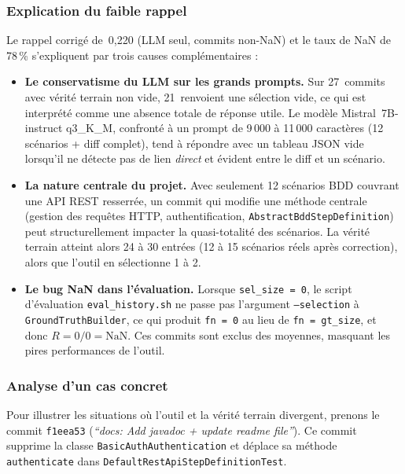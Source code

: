 \documentclass[12pt,a4paper]{article}
\begin{document}
\subsubsection{Explication du faible rappel}

Le rappel corrigé de~0{,}220 (LLM seul, commits non-NaN) et le taux de NaN
de 78\,\% s'expliquent par trois causes complémentaires :

\begin{itemize}
  \item \textbf{Le conservatisme du LLM sur les grands prompts.}
        Sur 27~commits avec vérité terrain non vide, 21~renvoient une
        sélection vide, ce qui est interprété comme une absence totale
        de réponse utile. Le modèle Mistral~7B-instruct q3\_K\_M,
        confronté à un prompt de 9\,000 à 11\,000 caractères (12 scénarios
        + diff complet), tend à répondre avec un tableau JSON vide lorsqu'il
        ne détecte pas de lien \emph{direct} et évident entre le diff et un
        scénario.

  \item \textbf{La nature centrale du projet.} Avec seulement 12 scénarios
        BDD couvrant une API REST resserrée, un commit qui modifie une
        méthode centrale (gestion des requêtes HTTP, authentification,
        \texttt{AbstractBddStepDefinition}) peut structurellement impacter
        la quasi-totalité des scénarios. La vérité terrain atteint alors
        24 à 30 entrées (12 à 15 scénarios réels après correction), alors
        que l'outil en sélectionne 1 à 2.

  \item \textbf{Le bug NaN dans l'évaluation.}
        Lorsque \texttt{sel\_size = 0}, le script d'évaluation
        \texttt{eval\_history.sh} ne passe pas l'argument
        \texttt{--selection} à \texttt{GroundTruthBuilder}, ce qui
        produit \texttt{fn = 0} au lieu de \texttt{fn = gt\_size},
        et donc $R = 0/0 = \text{NaN}$. Ces commits sont exclus des
        moyennes, masquant les pires performances de l'outil.
\end{itemize}

\subsubsection{Analyse d'un cas concret}

Pour illustrer les situations où l'outil et la vérité terrain divergent,
prenons le commit \texttt{f1eea53} (\emph{``docs: Add javadoc + update
readme file''}). Ce commit supprime la classe
\texttt{BasicAuthAuthentication} et déplace sa méthode \texttt{authenticate}
dans \texttt{DefaultRestApiStepDefinitionTest}.
\end{document}
